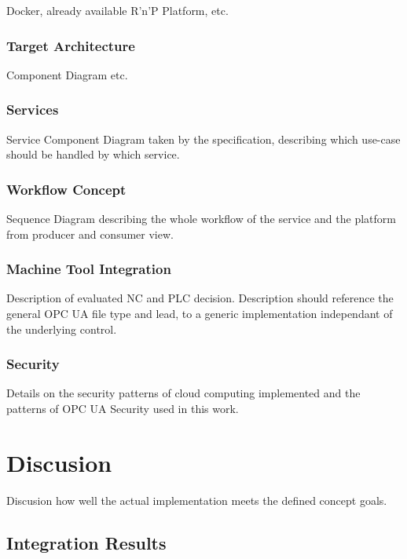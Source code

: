 \documentclass[
a4paper,
twoside,
headsepline,
cleardoublepage=empty,
parskip=half,
draft=false
]{scrbook}
\begin{document}
				Docker, already available R'n'P Platform, etc.
				
			\subsection{Target Architecture} \label{subsec:target_architecture}
			
				Component Diagram etc.
			
			\subsection{Services} \label{subsec:services}
			
				Service Component Diagram taken by the specification, describing which use-case should be handled by which service.
				
			\subsection{Workflow Concept} \label{subsec:workflow_concept}
			
				Sequence Diagram describing the whole workflow of the service and the platform from producer and consumer view.
				
			\subsection{Machine Tool Integration} \label{subsec:machine_tool_intergation}
			
				Description of evaluated NC and PLC decision. Description should reference the general OPC UA file type and lead, to a generic implementation independant of the underlying control.
				
			\subsection{Security} \label{subsec:security}
			
				Details on the security patterns of cloud computing implemented and the patterns of OPC UA Security used in this work.
				
	\chapter{Discusion} \label{ch:discusion}
	
		Discusion how well the actual implementation meets the defined concept goals.
		
		\section{Integration Results}\label{sec:integration_results}
		
\end{document}
